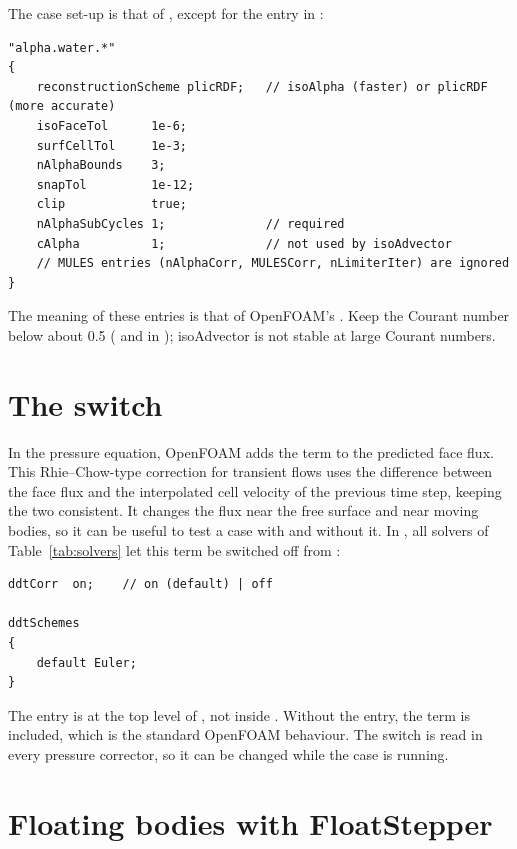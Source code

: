 The case set-up is that of , except for the  entry in
:
\begin{lstlisting}[caption={isoAdvector settings in \file{system/fvSolution} (\file{tutorials/waveIsoFoam}).}]
"alpha.water.*"
{
    reconstructionScheme plicRDF;   // isoAlpha (faster) or plicRDF (more accurate)
    isoFaceTol      1e-6;
    surfCellTol     1e-3;
    nAlphaBounds    3;
    snapTol         1e-12;
    clip            true;
    nAlphaSubCycles 1;              // required
    cAlpha          1;              // not used by isoAdvector
    // MULES entries (nAlphaCorr, MULESCorr, nLimiterIter) are ignored
}
\end{lstlisting}
The meaning of these entries is that of OpenFOAM's . Keep the Courant number
below about 0.5 ( and  in ); isoAdvector is
not stable at large Courant numbers.

\section{The \texorpdfstring{}{ddtCorr} switch}
\label{sec:ddtcorr}
In the pressure equation, OpenFOAM adds the term  to the predicted face
flux. This Rhie--Chow-type correction for transient flows uses the difference between the face
flux and the interpolated cell velocity of the previous time step, keeping the two consistent.
It changes the flux near the free surface and near moving bodies, so it can be useful to test a
case with and without it. In \fwt{}, all solvers of
Table~\ref{tab:solvers} let this term be switched off from :
\begin{lstlisting}[caption={The \kw{ddtCorr} switch in \file{system/fvSchemes}.}]
ddtCorr  on;    // on (default) | off

ddtSchemes
{
    default Euler;
}
\end{lstlisting}
The entry is at the top level of , not inside . Without the entry,
the term is included, which is the standard OpenFOAM behaviour. The switch is read in every
pressure corrector, so it can be changed while the case is running.

\section{Floating bodies with FloatStepper}
\label{sec:floatstepper}
